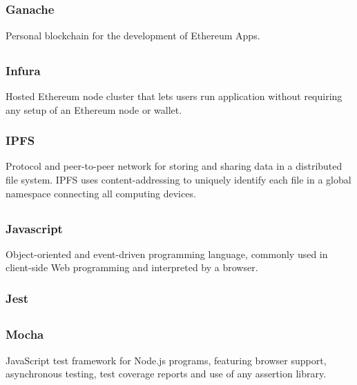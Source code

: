	\subsection*{}
		\subsubsection*{Ganache}
			Personal blockchain for the development of Ethereum \DJ{}Apps.
	
	\subsection*{}
		\subsubsection*{Infura}
			Hosted Ethereum node cluster that lets users run application without requiring any setup of an Ethereum node or wallet.
		\subsubsection*{IPFS}
			Protocol and peer-to-peer network for storing and sharing data in a distributed file system. IPFS uses content-addressing to uniquely identify each file in a global namespace connecting all computing devices. 
	
	\subsection*{}
		\subsubsection*{Javascript}
			Object-oriented and event-driven programming language, commonly used in client-side Web programming and interpreted by a browser.
		\subsubsection*{Jest}
	
	\subsection*{}
		\subsubsection*{Mocha}
			JavaScript test framework for Node.js programs, featuring browser support, asynchronous testing, test coverage reports and use of any assertion library.
	
